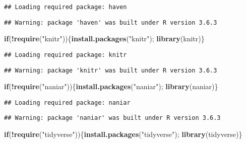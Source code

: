 \documentclass[
]{book}
\newenvironment{Shaded}{\begin{snugshade}}{\end{snugshade}}
\newcommand{\ControlFlowTok}[1]{\textcolor[rgb]{0.13,0.29,0.53}{\textbf{#1}}}
\newcommand{\KeywordTok}[1]{\textcolor[rgb]{0.13,0.29,0.53}{\textbf{#1}}}
\newcommand{\NormalTok}[1]{#1}
\newcommand{\OperatorTok}[1]{\textcolor[rgb]{0.81,0.36,0.00}{\textbf{#1}}}
\newcommand{\StringTok}[1]{\textcolor[rgb]{0.31,0.60,0.02}{#1}}
\begin{document}
\begin{verbatim}
## Loading required package: haven
\end{verbatim}

\begin{verbatim}
## Warning: package 'haven' was built under R version 3.6.3
\end{verbatim}

\begin{Shaded}
\begin{Highlighting}[]
\ControlFlowTok{if}\NormalTok{(}\OperatorTok{!}\KeywordTok{require}\NormalTok{(}\StringTok{"knitr"}\NormalTok{))\{}\KeywordTok{install.packages}\NormalTok{(}\StringTok{"knitr"}\NormalTok{);  }\KeywordTok{library}\NormalTok{(knitr)\}}
\end{Highlighting}
\end{Shaded}

\begin{verbatim}
## Loading required package: knitr
\end{verbatim}

\begin{verbatim}
## Warning: package 'knitr' was built under R version 3.6.3
\end{verbatim}

\begin{Shaded}
\begin{Highlighting}[]
\ControlFlowTok{if}\NormalTok{(}\OperatorTok{!}\KeywordTok{require}\NormalTok{(}\StringTok{"naniar"}\NormalTok{))\{}\KeywordTok{install.packages}\NormalTok{(}\StringTok{"naniar"}\NormalTok{);  }\KeywordTok{library}\NormalTok{(naniar)\}}
\end{Highlighting}
\end{Shaded}

\begin{verbatim}
## Loading required package: naniar
\end{verbatim}

\begin{verbatim}
## Warning: package 'naniar' was built under R version 3.6.3
\end{verbatim}

\begin{Shaded}
\begin{Highlighting}[]
\ControlFlowTok{if}\NormalTok{(}\OperatorTok{!}\KeywordTok{require}\NormalTok{(}\StringTok{"tidyverse"}\NormalTok{))\{}\KeywordTok{install.packages}\NormalTok{(}\StringTok{"tidyverse"}\NormalTok{);  }\KeywordTok{library}\NormalTok{(tidyverse)\}}
\end{Highlighting}
\end{Shaded}
\end{document}
